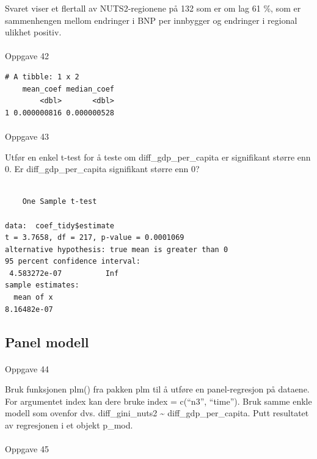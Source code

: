 \documentclass[
  a4paper,
]{article}
\makeatletter
\let\oldparagraph\paragraph
\renewcommand{\paragraph}{
    \@ifstar
      \xxxParagraphStar
      \xxxParagraphNoStar
  }
\newcommand{\xxxParagraphStar}[1]{\oldparagraph*{#1}\mbox{}}
\newcommand{\xxxParagraphNoStar}[1]{\oldparagraph{#1}\mbox{}}
\makeatother
\begin{document}
Svaret viser et flertall av NUTS2-regionene på 132 som er om lag 61 \%,
som er sammenhengen mellom endringer i BNP per innbygger og endringer i
regional ulikhet positiv.

\paragraph{Oppgave 42}\label{oppgave-42}

\begin{verbatim}
# A tibble: 1 x 2
    mean_coef median_coef
        <dbl>       <dbl>
1 0.000000816 0.000000528
\end{verbatim}

\paragraph{Oppgave 43}\label{oppgave-43}

Utfør en enkel t-test for å teste om diff\_gdp\_per\_capita er
signifikant større enn 0. Er diff\_gdp\_per\_capita signifikant større
enn 0?

\begin{verbatim}

    One Sample t-test

data:  coef_tidy$estimate
t = 3.7658, df = 217, p-value = 0.0001069
alternative hypothesis: true mean is greater than 0
95 percent confidence interval:
 4.583272e-07          Inf
sample estimates:
  mean of x 
8.16482e-07 
\end{verbatim}

\subsection{Panel modell}\label{panel-modell}

\paragraph{Oppgave 44}\label{oppgave-44}

Bruk funksjonen plm() fra pakken plm til å utføre en panel-regresjon på
dataene. For argumentet index kan dere bruke index = c(``n3'',
``time''). Bruk samme enkle modell som ovenfor dvs. diff\_gini\_nuts2
\textasciitilde{} diff\_gdp\_per\_capita. Putt resultatet av regresjonen
i et objekt p\_mod.

\paragraph{Oppgave 45}\label{oppgave-45}
\end{document}
